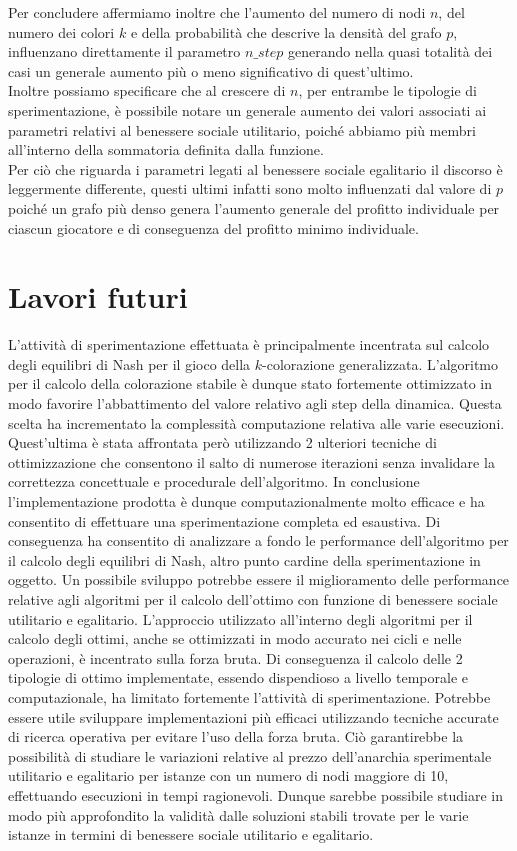 Per concludere affermiamo inoltre che l'aumento del numero di nodi $n$, del numero dei colori $k$ e della probabilità che descrive la densità del grafo $p$, influenzano direttamente il parametro $n\_step$ generando nella quasi totalità dei casi un generale aumento più o meno significativo di quest'ultimo.\\
Inoltre possiamo specificare che al crescere di $n$, per entrambe le tipologie di sperimentazione, è possibile notare un generale aumento dei valori associati ai parametri relativi al benessere sociale utilitario, poiché abbiamo più membri all'interno della sommatoria definita dalla funzione.\\
Per ciò che riguarda i parametri legati al benessere sociale egalitario il discorso è leggermente differente, questi ultimi infatti sono molto influenzati dal valore di $p$ poiché un grafo più denso genera l'aumento generale del profitto individuale per ciascun giocatore e di conseguenza del profitto minimo individuale.\\ 

\section{Lavori futuri}
\justify
L'attività di sperimentazione effettuata è principalmente incentrata sul calcolo degli equilibri di Nash per il gioco della $k$-colorazione generalizzata. L'algoritmo per il calcolo della colorazione stabile è dunque stato fortemente ottimizzato in modo favorire l'abbattimento del valore relativo agli step della dinamica. Questa scelta ha incrementato la complessità computazione relativa alle varie esecuzioni. Quest'ultima è stata affrontata però utilizzando 2 ulteriori tecniche di ottimizzazione che consentono il salto di numerose iterazioni senza invalidare la correttezza concettuale e procedurale dell'algoritmo. In conclusione l'implementazione prodotta è dunque computazionalmente molto efficace e ha consentito di effettuare una sperimentazione completa ed esaustiva. Di conseguenza ha consentito di analizzare a fondo le performance dell'algoritmo per il calcolo degli equilibri di Nash, altro punto cardine della sperimentazione in oggetto.
Un possibile sviluppo potrebbe essere il miglioramento delle performance relative agli algoritmi per il calcolo dell'ottimo con funzione di benessere sociale utilitario e egalitario. L'approccio utilizzato all'interno degli algoritmi per il calcolo degli ottimi, anche se ottimizzati in modo accurato nei cicli e nelle operazioni, è incentrato sulla forza bruta. Di conseguenza il calcolo delle 2 tipologie di ottimo implementate, essendo dispendioso a livello temporale e computazionale, ha limitato fortemente l'attività di sperimentazione. Potrebbe essere utile sviluppare implementazioni più efficaci utilizzando tecniche accurate di ricerca operativa per evitare l'uso della forza bruta. Ciò garantirebbe la possibilità di studiare le variazioni relative al prezzo dell'anarchia sperimentale utilitario e egalitario per istanze con un numero di nodi maggiore di 10, effettuando esecuzioni in tempi ragionevoli. Dunque sarebbe possibile studiare in modo più approfondito la validità dalle soluzioni stabili trovate per le varie istanze in termini di benessere sociale utilitario e egalitario.